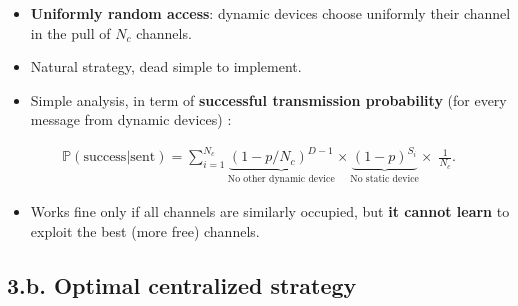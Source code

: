 \begin{frameO}

    \begin{itemize}\tightlist
        \item
              \textbf{Uniformly random access}: dynamic devices choose uniformly
              their channel in the pull of \(N_c\) channels.
        \item
              Natural strategy, dead simple to implement.
    \end{itemize}


    \begin{itemize}\tightlist
        \item
              Simple analysis, in term of \textbf{successful transmission
                  probability} (for every message from dynamic devices) :
    \end{itemize}

    \begin{small} \begin{align*}
            \mathbb{P}(\text{success}|\text{sent}) = \sum_{i=1}^{N_c} \underbrace{(1 - p / N_c)^{D-1}}_{\text{No other dynamic device}} \times \underbrace{(1-p)^{S_i}}_{\text{No static device}} \times\; \frac{1}{N_c}.
        \end{align*} \end{small}


    \begin{itemize}\tightlist
        \item
              Works fine only if all channels are similarly occupied,\newline
              but \textbf{it cannot learn} to exploit the best (more free)
              channels.
    \end{itemize}

\end{frameO}



\subsection{\hfill{}3.b. Optimal centralized strategy\hfill{}}

